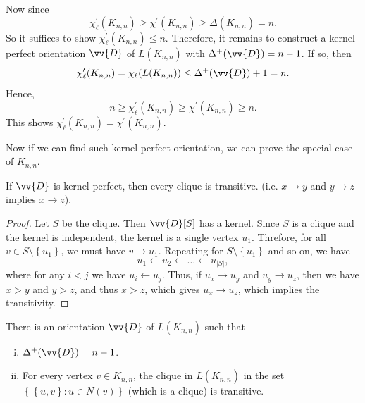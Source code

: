 Now since
\[
    \chi_{\ell }^{\prime} (K_{n, n}) \ge \chi^{\prime}  (K_{n, n}) \ge \Delta (K_{n, n}) = n.
\] 
So it suffices to show \(\chi _\ell ^{\prime} (K_{n, n}) \le n\). Therefore, it remains to construct a kernel-perfect orientation \(\vv{D}\) of \(L(K_{n, n})\) with \(\Delta ^+ (\vv{D}) = n - 1\). If so, then 
\[
    \chi _\ell ^{\prime} (K_{n, n}) = \chi _\ell (L(K_{n, n})) \le \Delta ^+(\vv{D}) + 1 = n.
\]  
Hence,
\[
    n \ge \chi _\ell ^{\prime} (K_{n, n}) \ge \chi ^{\prime} (K_{n, n}) \ge n.
\]
This shows \(\chi _\ell ^{\prime} (K_{n, n}) = \chi ^{\prime} (K_{n, n})\).

Now if we can find such kernel-perfect orientation, we can prove the special case of \(K_{n, n}\).

\begin{observation}
    If \(\vv{D}\) is kernel-perfect, then every clique is transitive. (i.e. \(x \to y\) and \(y \to z\) implies \(x \to z\)). 
\end{observation}  

\begin{proof}
    Let \(S\) be the clique. Then \(\vv{D} [S]\) has a kernel. Since \(S\) is a clique and the kernel is independent, the kernel is a single vertex \(u_1\). Threfore, for all \(v \in S \setminus \left\{ u_1 \right\} \), we must have \(v \to u_1\). Repeating for \(S \setminus \left\{ u_1 \right\} \) and so on, we have
    \[
        u_1 \leftarrow u_2 \leftarrow \dots \leftarrow u_{\vert S \vert },
    \]       
    where for any \(i < j\) we have \(u_i \leftarrow u_j\). Thus, if \(u_x \to u_y\) and \(u_y \to u_z\), then we have \(x > y\) and \(y > z\), and thus \(x > z\), which gives \(u_x \to u_z\), which implies the transitivity.        
\end{proof}

\begin{claim}
    There is an orientation \(\vv{D}\) of \(L(K_{n, n})\) such that 
    \begin{enumerate}[(i)]
        \item \(\Delta ^+ (\vv{D}) = n - 1\). 
        \item For every vertex \(v \in K_{n, n}\), the clique in \(L(K_{n, n})\) in the set \(\left\{ \left\{ u, v \right\}: u \in N(v)  \right\} \) (which is a clique) is transitive.   
    \end{enumerate}  
\end{claim}


